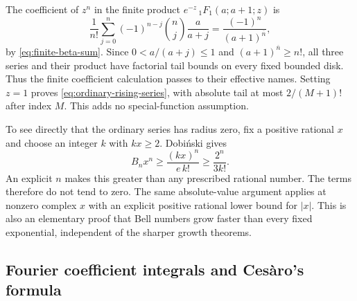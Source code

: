 The coefficient of $z^n$ in the finite product
$e^{-z}\,{}_1F_1(a;a+1;z)$ is
\[
 \frac1{n!}\sum_{j=0}^{n}(-1)^{n-j}\binom nj\frac{a}{a+j}
   =\frac{(-1)^n}{(a+1)^{\overline n}},
\]
by \eqref{eq:finite-beta-sum}. Since $0<a/(a+j)\leq1$ and
$(a+1)^{\overline n}\geq n!$, all three series and their product have
factorial tail bounds on every fixed bounded disk. Thus the finite coefficient
calculation passes to their effective names. Setting $z=1$ proves
\eqref{eq:ordinary-rising-series}, with absolute tail at most
$2/(M+1)!$ after index $M$. This adds no special-function assumption.

To see directly that the ordinary series has radius zero, fix a positive
rational $x$ and choose an integer $k$ with $kx\ge2$.  Dobi\'nski gives
\[
 B_nx^n\ge\frac{(kx)^n}{e\,k!}\ge\frac{2^n}{3k!}.
\]
An explicit $n$ makes this greater than any prescribed rational number.
The terms therefore do not tend to zero.  The same absolute-value argument
applies at nonzero complex $x$ with an explicit positive rational lower bound
for $|x|$.  This is also an elementary proof that Bell numbers grow faster
than every fixed exponential, independent of the sharper growth theorems.

\subsection{Fourier coefficient integrals and Ces\`aro's formula}

